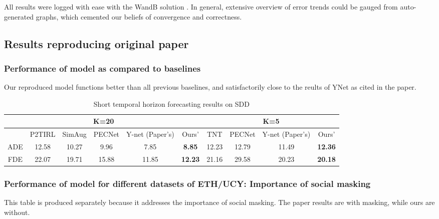 All results were logged with ease with the WandB solution \cite{wandb}. In general, extensive overview of error trends could be gauged from auto-generated graphs, which cemented our beliefs of convergence and correctness.

\subsection{Results reproducing original paper}

\subsubsection{Performance of model as compared to baselines}

Our reproduced model functions better than all previous baselines, and satisfactorily close to the reults of YNet as cited in the paper. 

\begin{table}[H]
\vspace*{-.1in}
\begin{center}
\begin{tabular}{ |c|c|c|c|c|c|c|c|c|c| }
 \hline
 \multicolumn{6}{|c|}{K=20} & \multicolumn{4}{|c|}{K=5}  
 \\
 \hline
  & P2TIRL\cite{deo2021trajectory}& SimAug\cite{liang2020simaug} & PECNet\cite{mangalam2020journey} & Y-net (Paper's)  & Ours' & TNT\cite{zhao2020tnt} & PECNet\cite{mangalam2020journey}  & Y-net (Paper's) & Ours'  \\ 
  \hline
 ADE & 12.58 & 10.27 & 9.96 & 7.85 & \textbf{8.85}  & 12.23 & 12.79 & 11.49 & \textbf{12.36}  \\ 
 \hline
 FDE & 22.07 & 19.71 & 15.88 & 11.85 & \textbf{12.23} & 21.16 & 29.58 & 20.23 & \textbf{20.18}\\ 
 \hline

\end{tabular}
\bigskip
\caption{Short temporal horizon forecasting results on SDD}
\label{eq:result_1}
\end{center}
\vspace*{-.1in}
\end{table}


\subsubsection{Performance of model for different datasets of ETH/UCY: Importance of social masking}

This table is produced separately because it addresses the importance of social masking. The paper results are with masking, while ours are without.

